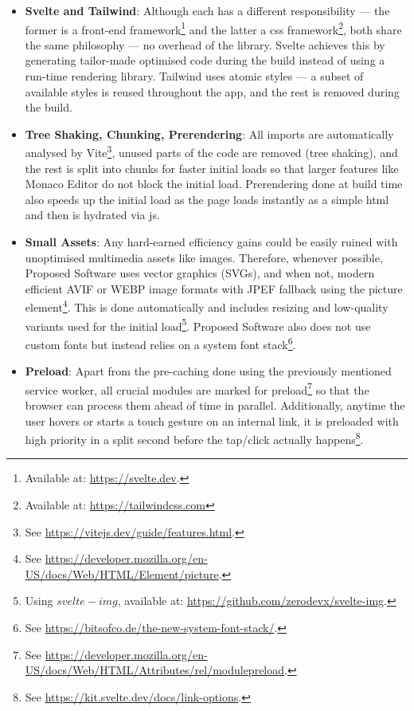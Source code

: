 \begin{itemize}
    \item \textbf{Svelte and Tailwind}: Although each has a different responsibility --- the former is a front-end framework\footnote{Available at: \url{https://svelte.dev}.} and the latter a \gls{css} framework\footnote{Available at: \url{https://tailwindcss.com}}, both share the same philosophy --- no overhead of the library. Svelte achieves this by generating tailor-made optimised code during the build instead of using a run-time rendering library. Tailwind uses atomic styles --- a subset of available styles is reused throughout the app, and the rest is removed during the build.
    \item \textbf{Tree Shaking, Chunking, Prerendering}: All imports are automatically analysed by Vite\footnote{See \url{https://vitejs.dev/guide/features.html}.}, unused parts of the code are removed (tree shaking), and the rest is split into chunks for faster initial loads so that larger features like Monaco Editor do not block the initial load. Prerendering done at build time also speeds up the initial load as the page loads instantly as a simple \gls{html} and then is hydrated via \gls{js}.
    \item \textbf{Small Assets}: Any hard-earned efficiency gains could be easily ruined with unoptimised multimedia assets like images. Therefore, whenever possible, Proposed Software uses vector graphics (SVGs), and when not, modern efficient AVIF or WEBP image formats with JPEF fallback using the picture element\footnote{See \url{https://developer.mozilla.org/en-US/docs/Web/HTML/Element/picture}.}. This is done automatically and includes resizing and low-quality variants used for the initial load\footnote{Using $svelte-img$, available at: \url{https://github.com/zerodevx/svelte-img}.}. Proposed Software also does not use custom fonts but instead relies on a system font stack\footnote{See \url{https://bitsofco.de/the-new-system-font-stack/}.}.
    \item \textbf{Preload}: Apart from the pre-caching done using the previously mentioned service worker, all crucial modules are marked for preload\footnote{See \url{https://developer.mozilla.org/en-US/docs/Web/HTML/Attributes/rel/modulepreload}.} so that the browser can process them ahead of time in parallel. Additionally, anytime the user hovers or starts a touch gesture on an internal link, it is preloaded with high priority in a split second before the tap/click actually happens\footnote{See \url{https://kit.svelte.dev/docs/link-options}.}.
\end{itemize}

